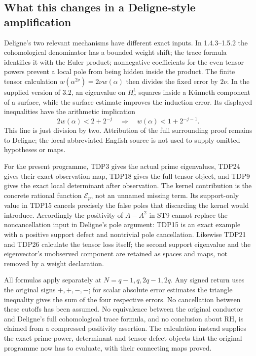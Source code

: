 \documentclass[11pt]{article}
\begin{document}
\subsection{What this changes in a Deligne-style amplification}

Deligne's two relevant mechanisms have different exact inputs. In
1.4.3--1.5.2 the cohomological denominator has a bounded weight shift;
the trace formula identifies it with the Euler product; nonnegative
coefficients for the even tensor powers prevent a local pole from
being hidden inside the product. The finite tensor calculation
$w(\alpha^{2\nu})=2\nu w(\alpha)$ then divides the fixed error by
$2\nu$. In the supplied version of 3.2, an eigenvalue on $H^1_c$
squares inside a K\"unneth component of a surface, while the surface
estimate improves the induction error. Its displayed inequalities have
the arithmetic implication
\begin{equation}\tag{TDP27}
2w(\alpha)<2+2^{-j}\quad\Longrightarrow\quad
w(\alpha)<1+2^{-j-1}.
\end{equation}
This line is just division by two. Attribution of the full surrounding
proof remains to Deligne; the local abbreviated English source is not
used to supply omitted hypotheses or maps.

For the present programme, TDP3 gives the actual prime eigenvalues,
TDP24 gives their exact observation map, TDP18 gives the full tensor
object, and TDP9 gives the exact local determinant after observation.
The kernel contribution is the concrete rational function
$\mathcal E_p$, not an unnamed missing term. Its support-only value in
TDP15 cancels precisely the false poles that discarding the kernel
would introduce. Accordingly the positivity of $A-A^2$ in ST9 cannot
replace the noncancellation input in Deligne's pole argument: TDP15 is
an exact example with a positive support defect and nontrivial pole
cancellation. Likewise TDP21 and TDP26 calculate the tensor loss itself;
the second support eigenvalue and the eigenvector's unobserved component
are retained as spaces and maps, not removed by a weight declaration.

All formulas apply separately at $N=q-1,q,2q-1,2q$. Any signed return
uses the original signs $+,+,-,-$; for scalar absolute error estimates
the triangle inequality gives the sum of the four respective errors.
No cancellation between these cutoffs has been assumed. No equivalence
between the original conductor and Deligne's full cohomological trace
formula, and no conclusion about RH, is claimed from a compressed
positivity assertion. The calculation instead supplies the exact
prime-power, determinant and tensor defect objects that the original
programme now has to evaluate, with their connecting maps proved.
\end{document}

